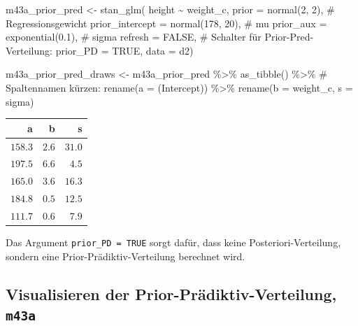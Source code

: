 \documentclass[
  a4paper,
  DIV=11]{scrreprt}
\newenvironment{Shaded}{\begin{snugshade}}{\end{snugshade}}
\newcommand{\AttributeTok}[1]{\textcolor[rgb]{0.40,0.45,0.13}{#1}}
\newcommand{\CommentTok}[1]{\textcolor[rgb]{0.37,0.37,0.37}{#1}}
\newcommand{\ConstantTok}[1]{\textcolor[rgb]{0.56,0.35,0.01}{#1}}
\newcommand{\DecValTok}[1]{\textcolor[rgb]{0.68,0.00,0.00}{#1}}
\newcommand{\FloatTok}[1]{\textcolor[rgb]{0.68,0.00,0.00}{#1}}
\newcommand{\FunctionTok}[1]{\textcolor[rgb]{0.28,0.35,0.67}{#1}}
\newcommand{\NormalTok}[1]{\textcolor[rgb]{0.00,0.23,0.31}{#1}}
\newcommand{\OtherTok}[1]{\textcolor[rgb]{0.00,0.23,0.31}{#1}}
\newcommand{\SpecialCharTok}[1]{\textcolor[rgb]{0.37,0.37,0.37}{#1}}
\newcommand{\StringTok}[1]{\textcolor[rgb]{0.13,0.47,0.30}{#1}}
\theoremstyle{definition}
\theoremstyle{remark}
\begin{document}
\begin{Shaded}
\begin{Highlighting}[]
\NormalTok{m43a\_prior\_pred }\OtherTok{\textless{}{-}}
    \FunctionTok{stan\_glm}\NormalTok{(}
\NormalTok{      height }\SpecialCharTok{\textasciitilde{}}\NormalTok{ weight\_c, }
      \AttributeTok{prior =} \FunctionTok{normal}\NormalTok{(}\DecValTok{2}\NormalTok{, }\DecValTok{2}\NormalTok{),  }\CommentTok{\# Regressionsgewicht}
      \AttributeTok{prior\_intercept =} \FunctionTok{normal}\NormalTok{(}\DecValTok{178}\NormalTok{, }\DecValTok{20}\NormalTok{),  }\CommentTok{\# mu}
      \AttributeTok{prior\_aux =} \FunctionTok{exponential}\NormalTok{(}\FloatTok{0.1}\NormalTok{),  }\CommentTok{\# sigma}
      \AttributeTok{refresh =} \ConstantTok{FALSE}\NormalTok{, }
      \CommentTok{\# Schalter für Prior{-}Pred{-}Verteilung:}
      \AttributeTok{prior\_PD =} \ConstantTok{TRUE}\NormalTok{, }
      \AttributeTok{data =}\NormalTok{ d2)}


\NormalTok{m43a\_prior\_pred\_draws }\OtherTok{\textless{}{-}} 
\NormalTok{  m43a\_prior\_pred }\SpecialCharTok{\%\textgreater{}\%} 
  \FunctionTok{as\_tibble}\NormalTok{() }\SpecialCharTok{\%\textgreater{}\%} 
  \CommentTok{\# Spaltennamen kürzen: }
  \FunctionTok{rename}\NormalTok{(}\AttributeTok{a =} \StringTok{\textasciigrave{}}\AttributeTok{(Intercept)}\StringTok{\textasciigrave{}}\NormalTok{) }\SpecialCharTok{\%\textgreater{}\%}  
  \FunctionTok{rename}\NormalTok{(}\AttributeTok{b =}\NormalTok{ weight\_c,}
         \AttributeTok{s =}\NormalTok{ sigma)}
\end{Highlighting}
\end{Shaded}

\begin{longtable}{rrr}
\toprule
a & b & s \\ 
\midrule
$158.3$ & $2.6$ & $31.0$ \\ 
$197.5$ & $6.6$ & $4.5$ \\ 
$165.0$ & $3.6$ & $16.3$ \\ 
$184.8$ & $0.5$ & $12.5$ \\ 
$111.7$ & $0.6$ & $7.9$ \\ 
\bottomrule
\end{longtable}

Das Argument \texttt{prior\_PD\ =\ TRUE} sorgt dafür, dass keine
Posteriori-Verteilung, sondern eine Prior-Prädiktiv-Verteilung berechnet
wird.

\hypertarget{visualisieren-der-prior-pruxe4diktiv-verteilung-m43a}{%
\subsection{\texorpdfstring{Visualisieren der
Prior-Prädiktiv-Verteilung,
\texttt{m43a}}{Visualisieren der Prior-Prädiktiv-Verteilung, m43a}}\label{visualisieren-der-prior-pruxe4diktiv-verteilung-m43a}}
\end{document}
